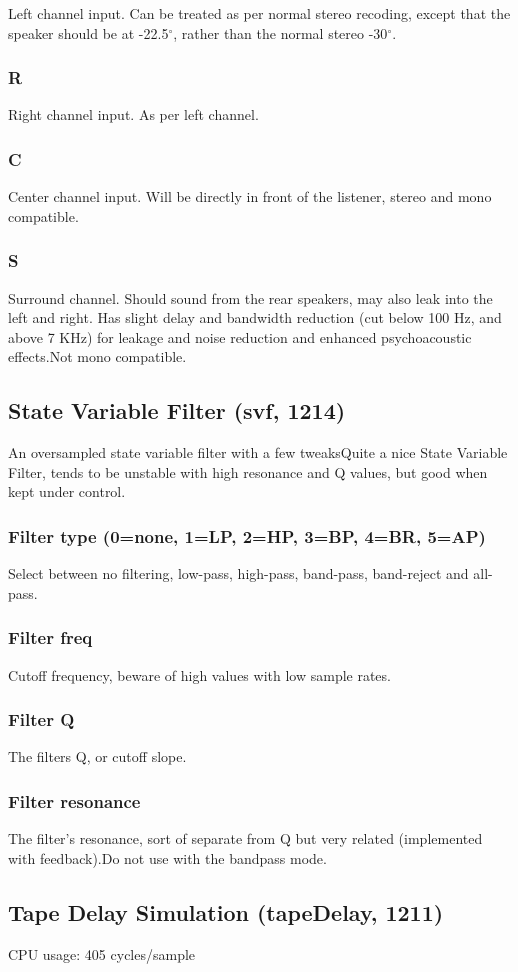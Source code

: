 \documentclass[11pt]{article}
\begin{document}
Left channel input. Can be treated as per normal stereo recoding, except that the speaker should be at -22.5$^\circ$, rather than the normal stereo -30$^\circ$.\subsubsection*{R}
Right channel input. As per left channel.\subsubsection*{C}
Center channel input. Will be directly in front of the listener, stereo and mono compatible.\subsubsection*{S}
Surround channel. Should sound from the rear speakers, may also leak into the left and right. Has slight delay and bandwidth reduction (cut below 100 Hz, and above 7 KHz) for leakage and noise reduction and enhanced psychoacoustic effects.Not mono compatible.\subsection{State Variable Filter (svf, 1214)\label{svf}\label{id1214}}
An oversampled state variable filter with a few tweaksQuite a nice State Variable Filter, tends to be unstable with high resonance and Q values, but good when kept under control.\subsubsection*{Filter type (0=none, 1=LP, 2=HP, 3=BP, 4=BR, 5=AP)}
Select between no filtering, low-pass, high-pass, band-pass, band-reject and all-pass.\subsubsection*{Filter freq}
Cutoff frequency, beware of high values with low sample rates.\subsubsection*{Filter Q}
The filters Q, or cutoff slope.\subsubsection*{Filter resonance}
The filter's resonance, sort of separate from Q but very related (implemented with feedback).Do not use with the bandpass mode.\subsection{Tape Delay Simulation (tapeDelay, 1211)\label{tapeDelay}\label{id1211}}
CPU usage: 405 cycles/sample
\end{document}

